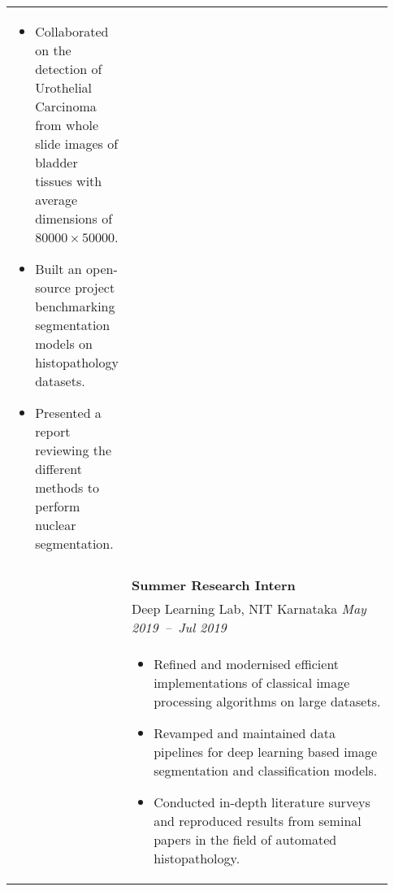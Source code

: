 \documentclass[letterpaper, 10pt, oneside]{article}
\newcommand{\bdit}[1]{{\textbf{#1}}}
\begin{document}
\begin{longtable}{@{} p{0.13\linewidth} p{0.8\linewidth}}
{\begin{itemize}[leftmargin=*, itemsep=-0.88ex, topsep=-0.88ex]
            \item Collaborated on the detection of Urothelial Carcinoma from whole slide images of bladder tissues with average dimensions of $80000\times50000$.
            \item Built an open-source project benchmarking segmentation models on histopathology datasets.
            \item Presented a report reviewing the different methods to perform nuclear segmentation.
        \end{itemize}
    }
    \\
    \\
                         & \bdit{Summer Research Intern}                                                                                                                                             \\
                         & Deep Learning Lab, NIT Karnataka \hfill \hspace{-3em} \textsl{May 2019\ --\ Jul 2019}                                                                                     \\
                         & \parbox{0.8\textwidth}{                                                                                                                                                   %
        \begin{itemize}[leftmargin=*, itemsep=-0.88ex, topsep=-0.88ex]
            \item Refined and modernised efficient implementations of classical image processing algorithms on large datasets.
            \item Revamped and maintained data pipelines for deep learning based image segmentation and classification models.
            \item Conducted in-depth literature surveys and reproduced results from seminal papers in the field of automated histopathology.
        \end{itemize}
    }
    \\
    \\


\end{longtable}
\end{document}
